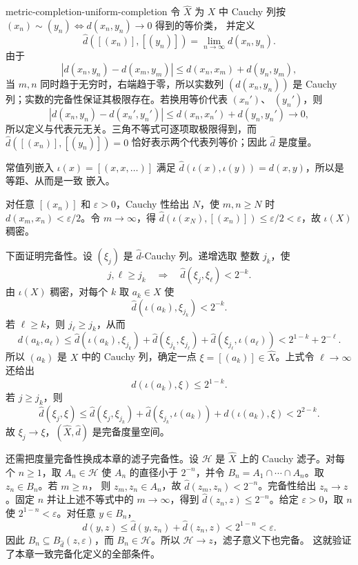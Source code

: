 \begin{solution}{metric-completion-uniform-completion}
令 \(\widehat X\) 为 \(X\) 中 Cauchy 列按
\((x_n)\sim(y_n)\Longleftrightarrow d(x_n,y_n)\to0\) 得到的等价类，
并定义
\[
 \widehat d([(x_n)],[(y_n)])=\lim_{n\to\infty}d(x_n,y_n).
\]
由于
\[
 |d(x_n,y_n)-d(x_m,y_m)|
 \le d(x_n,x_m)+d(y_n,y_m),
\]
当 \(m,n\) 同时趋于无穷时，右端趋于零，所以实数列
\((d(x_n,y_n))\) 是 Cauchy 列；实数的完备性保证其极限存在。若换用等价代表 \((x_n')\)、
\((y_n')\)，则
\[
 |d(x_n,y_n)-d(x_n',y_n')|
 \le d(x_n,x_n')+d(y_n,y_n')\longrightarrow0,
\]
所以定义与代表元无关。三角不等式可逐项取极限得到，而
\(\widehat d([(x_n)],[(y_n)])=0\) 恰好表示两个代表列等价；因此
\(\widehat d\) 是度量。

常值列嵌入 \(\iota(x)=[(x,x,\ldots)]\) 满足
\(\widehat d(\iota(x),\iota(y))=d(x,y)\)，所以是等距、从而是一致
嵌入。

对任意 \([(x_n)]\) 和 \(\varepsilon>0\)，Cauchy 性给出 \(N\)，使
\(m,n\ge N\) 时 \(d(x_m,x_n)<\varepsilon/2\)。令 \(m\to\infty\)，得
\(\widehat d(\iota(x_N),[(x_n)])\le\varepsilon/2<\varepsilon\)，故
\(\iota(X)\) 稠密。

下面证明完备性。设 \((\xi_j)\) 是 \(\widehat d\)-Cauchy 列。递增选取
整数 \(j_k\)，使
\[
 j,\ell\ge j_k\quad\Longrightarrow\quad
 \widehat d(\xi_j,\xi_\ell)<2^{-k}.
\]
由 \(\iota(X)\) 稠密，对每个 \(k\) 取 \(a_k\in X\) 使
\[
 \widehat d(\iota(a_k),\xi_{j_k})<2^{-k}.
\]
若 \(\ell\ge k\)，则 \(j_\ell\ge j_k\)，从而
\[
 d(a_k,a_\ell)
 \le \widehat d(\iota(a_k),\xi_{j_k})
   +\widehat d(\xi_{j_k},\xi_{j_\ell})
   +\widehat d(\xi_{j_\ell},\iota(a_\ell))
 <2^{1-k}+2^{-\ell}.
\]
所以 \((a_k)\) 是 \(X\) 中的 Cauchy 列，确定一点
\(\xi=[(a_k)]\in\widehat X\)。上式令 \(\ell\to\infty\) 还给出
\[
 \widehat d(\iota(a_k),\xi)\le2^{1-k}.
\]
若 \(j\ge j_k\)，则
\[
 \widehat d(\xi_j,\xi)
 \le\widehat d(\xi_j,\xi_{j_k})
   +\widehat d(\xi_{j_k},\iota(a_k))
   +\widehat d(\iota(a_k),\xi)
 <2^{2-k}.
\]
故 \(\xi_j\to\xi\)，\((\widehat X,\widehat d)\) 是完备度量空间。

还需把度量完备性换成本章的滤子完备性。设 \(\mathcal H\) 是
\(\widehat X\) 上的 Cauchy 滤子。对每个 \(n\ge1\)，取
\(A_n\in\mathcal H\) 使 \(A_n\) 的直径小于 \(2^{-n}\)，并令
\(B_n=A_1\cap\cdots\cap A_n\)。取 \(z_n\in B_n\)。若 \(m\ge n\)，
则 \(z_m,z_n\in A_n\)，故 \(\widehat d(z_m,z_n)<2^{-n}\)。完备性给出
\(z_n\to z\)。固定 \(n\) 并让上述不等式中的 \(m\to\infty\)，得到
\(\widehat d(z_n,z)\le2^{-n}\)。给定 \(\varepsilon>0\)，取 \(n\) 使
\(2^{1-n}<\varepsilon\)。对任意
\(y\in B_n\)，
\[
 \widehat d(y,z)
 \le\widehat d(y,z_n)+\widehat d(z_n,z)
 <2^{1-n}<\varepsilon.
\]
因此 \(B_n\subseteq B_{\widehat d}(z,\varepsilon)\)，而
\(B_n\in\mathcal H\)。所以 \(\mathcal H\to z\)，滤子意义下也完备。
这就验证了本章一致完备化定义的全部条件。
\end{solution}

